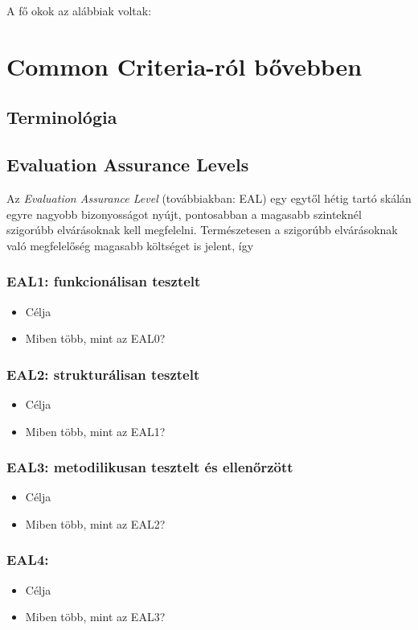A fő okok az alábbiak voltak:



\section{Common Criteria-ról bővebben}

\subsection{Terminológia}

\subsection{Evaluation Assurance Levels}

Az \emph{Evaluation Assurance Level} (továbbiakban: EAL) egy egytől hétig tartó skálán egyre nagyobb
bizonyosságot nyújt, pontosabban a magasabb szinteknél szigorúbb elvárásoknak kell megfelelni.
Természetesen a szigorúbb elvárásoknak való megfelelőség magasabb költséget is jelent,
így 

\subsubsection{EAL1: funkcionálisan tesztelt}
\begin{itemize}
    \item{Célja}
    \item{Miben több, mint az EAL0?}
\end{itemize}

\subsubsection{EAL2: strukturálisan tesztelt}
\begin{itemize}
    \item{Célja}
    \item{Miben több, mint az EAL1?}
\end{itemize}
\subsubsection{EAL3: metodilikusan tesztelt és ellenőrzött}
\begin{itemize}
    \item{Célja}
    \item{Miben több, mint az EAL2?}
\end{itemize}
\subsubsection{EAL4: }
\begin{itemize}
    \item{Célja}
    \item{Miben több, mint az EAL3?}
\end{itemize}
